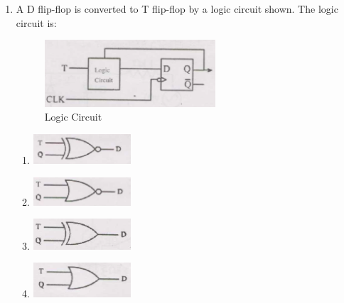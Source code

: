 \documentclass[journal,cmex10]{IEEEtran}
\theoremstyle{remark}
\numberwithin{equation}{enumi}
\numberwithin{figure}{enumi}
\begin{document}
\begin{enumerate}[label=\arabic*)]
    \item A D flip-flop is converted to T flip-flop by a logic circuit shown. The logic circuit is:
    \begin{figure}[htbp]
  \centering
  \includegraphics[width=0.6\textwidth]{figs/C/fig12.png}
  \caption{Logic Circuit}
  \label{C/fig12.png}
\end{figure}
    \bigskip
    \hfill {}
    \begin{enumerate}[label=\alph*)]
        \item \begin{center}\includegraphics[width=0.3\textwidth]{figs/C/fig22a.png}\end{center}
        \item \begin{center}\includegraphics[width=0.3\textwidth]{figs/C/fig22b.png}\end{center}
        \item \begin{center}\includegraphics[width=0.3\textwidth]{figs/C/fig22c.png}\end{center}
        \item \begin{center}\includegraphics[width=0.3\textwidth]{figs/C/fig22d.png}\end{center}
    \end{enumerate}
    \newpage


\end{enumerate}
\end{document}
